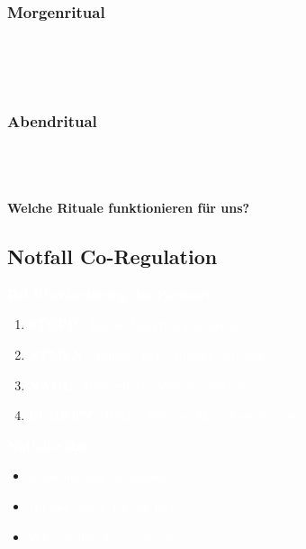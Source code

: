 \begin{ctmmOrangeBox}[title=Tägliche Verbindungsrituale]

\subsubsection{Morgenritual}
\\
\\
\\

\subsubsection{Abendritual}
\\
\\
\\

\textbf{Welche Rituale funktionieren für uns?} \\

\end{ctmmOrangeBox}

\subsection{Notfall Co-Regulation}

\begin{ctmmRedBox}[title=\textcolor{white}{Akute Regulationshilfe}]

\textcolor{white}{\textbf{Bei Überforderung des Partners:}}

\begin{enumerate}
  \item[\textcolor{white}{1.}] \textcolor{white}{\textbf{STOPP} - Eigene Reaktion regulieren}
  \item[\textcolor{white}{2.}] \textcolor{white}{\textbf{ATMEN} - Ruhige, tiefe Atmung vorleben}
  \item[\textcolor{white}{3.}] \textcolor{white}{\textbf{NÄHE} - Körperliche Präsenz anbieten}
  \item[\textcolor{white}{4.}] \textcolor{white}{\textbf{FÜHREN} - Ruhige Stimme, klare Anweisungen}
\end{enumerate}

\textcolor{white}{\textbf{Notfall-Sätze:}}
\begin{itemize}
  \item[\textcolor{white}{*}] \textcolor{white}{\glqq Atme mit mir zusammen\grqq}
  \item[\textcolor{white}{*}] \textcolor{white}{\glqq Du bist sicher, ich bin hier\grqq}
  \item[\textcolor{white}{*}] \textcolor{white}{\glqq Wir schaffen das zusammen\grqq}
\end{itemize}

\end{ctmmRedBox}

